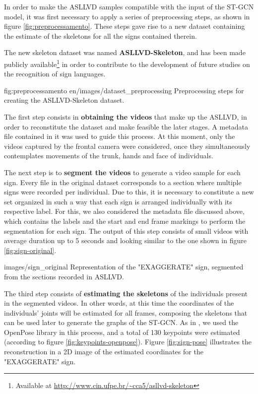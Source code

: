 In order to make the ASLLVD samples compatible with the input of the ST-GCN model, it was first necessary to apply a series of preprocessing steps, as shown in figure \ref{fig:preprocessamento}. These steps gave rise to a new dataset containing the estimate of the skeletons for all the signs contained therein.

The new skeleton dataset was named \textbf{ASLLVD-Skeleton}, and has been made publicly available\footnote{
   Available at \url{http://www.cin.ufpe.br/~cca5/asllvd-skeleton}
} in order to contribute to the development of future studies on the recognition of sign languages.

\image
    {fig:preprocessamento}
    {en/images/dataset_preprocessing}
    {Preprocessing steps for creating the ASLLVD-Skeleton dataset.}

The first step consists in \textbf{obtaining the videos} that make up the ASLLVD, in order to reconstitute the dataset and make feasible the later stages. A metadata file contained in it was used to guide this process. At this moment, only the videos captured by the frontal camera were considered, once they simultaneously contemplates movements of the trunk, hands and face of individuals.

The next step is to \textbf{segment the videos} to generate a video sample for each sign. Every file in the original dataset corresponds to a section where multiple signs were recorded per individual. Due to this, it is necessary to constitute a new set organized in such a way that each sign is arranged individually with its respective label. For this, we also considered the metadata file discussed above, which contains the labels and the start and end frame markings to perform the segmentation for each sign. The output of this step consists of small videos with average duration up to 5 seconds and looking similar to the one shown in figure \ref{fig:sign-original}.

    {images/sign_original}
    {Representation of the "EXAGGERATE" sign, segmented from the sections recorded in ASLLVD.}

The third step consists of \textbf{estimating the skeletons} of the individuals present in the segmented videos. In other words, at this time the coordinates of the individuals' joints will be estimated for all frames, composing the skeletons that can be used later to generate the graphs of the ST-GCN. As in \cite {st-gcn-2018}, we used the OpenPose library in this process, and a total of 130 keypoints were estimated (according to figure \ref{fig:keypoints-openpose}). Figure \ref{fig:sign-pose} illustrates the reconstruction in a 2D image of the estimated coordinates for the "EXAGGERATE" sign.

